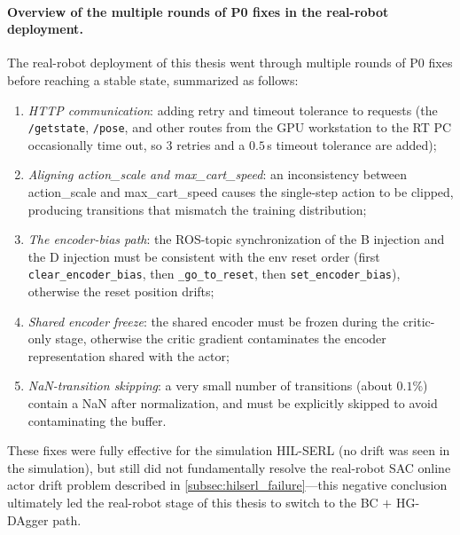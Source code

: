 \paragraph{Overview of the multiple rounds of P0 fixes in the real-robot deployment.} The real-robot deployment of this thesis went through multiple rounds of P0 fixes before reaching a stable state, summarized as follows:
\begin{enumerate}
  \item \emph{HTTP communication}: adding retry and timeout tolerance to requests (the \texttt{/getstate}, \texttt{/pose}, and other routes from the GPU workstation to the RT PC occasionally time out, so $3$ retries and a $0.5$\,s timeout tolerance are added);
  \item \emph{Aligning action\_scale and max\_cart\_speed}: an inconsistency between action\_scale and max\_cart\_speed causes the single-step action to be clipped, producing transitions that mismatch the training distribution;
  \item \emph{The encoder-bias path}: the ROS-topic synchronization of the B injection and the D injection must be consistent with the env reset order (first \texttt{clear\_encoder\_bias}, then \texttt{\_go\_to\_reset}, then \texttt{set\_encoder\_bias}), otherwise the reset position drifts;
  \item \emph{Shared encoder freeze}: the shared encoder must be frozen during the critic-only stage, otherwise the critic gradient contaminates the encoder representation shared with the actor;
  \item \emph{NaN-transition skipping}: a very small number of transitions (about $0.1\%$) contain a NaN after normalization, and must be explicitly skipped to avoid contaminating the buffer.
\end{enumerate}

These fixes were fully effective for the simulation HIL-SERL (no drift was seen in the simulation), but still did not fundamentally resolve the real-robot SAC online actor drift problem described in \cref{subsec:hilserl_failure}---this negative conclusion ultimately led the real-robot stage of this thesis to switch to the BC $+$ HG-DAgger path.
